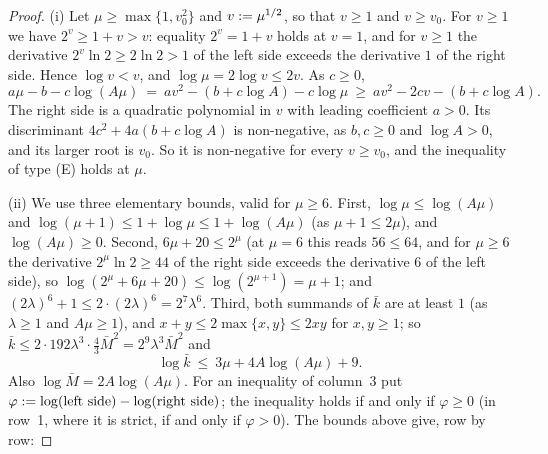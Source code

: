 \begin{proof}
(i) Let $\mu\ge\max\{1,v_0^2\}$ and $v\mathrel{:=}\mu^{1/2}$, so that $v\ge1$ and
$v\ge v_0$. For $v\ge1$ we have $2^v\ge1+v>v$: equality $2^v=1+v$ holds at
$v=1$, and for $v\ge1$ the derivative $2^v\ln2\ge2\ln2>1$ of the left side
exceeds the derivative $1$ of the right side. Hence $\log v<v$, and
$\log\mu=2\log v\le2v$. As $c\ge0$,
\[
a\mu-b-c\log(A\mu)\ =\ av^2-(b+c\log A)-c\log\mu\ \ge\ av^2-2cv-(b+c\log A).
\]
The right side is a quadratic polynomial in $v$ with leading coefficient
$a>0$. Its discriminant $4c^2+4a(b+c\log A)$ is non-negative, as $b,c\ge0$ and
$\log A>0$, and its larger root is $v_0$. So it is non-negative for every
$v\ge v_0$, and the inequality of type (E) holds at $\mu$.

(ii) We use three elementary bounds, valid for $\mu\ge6$. First,
$\log\mu\le\log(A\mu)$ and $\log(\mu+1)\le1+\log\mu\le1+\log(A\mu)$ (as
$\mu+1\le2\mu$), and $\log(A\mu)\ge0$. Second, $6\mu+20\le2^\mu$ (at $\mu=6$
this reads $56\le64$, and for $\mu\ge6$ the derivative $2^\mu\ln2\ge44$ of the
right side exceeds the derivative $6$ of the left side), so
$\log(2^\mu+6\mu+20)\le\log(2^{\mu+1})=\mu+1$; and
$(2\lambda)^6+1\le2\cdot(2\lambda)^6=2^7\lambda^6$. Third, both summands of
$\bar k$ are at least $1$ (as $\lambda\ge1$ and $A\mu\ge1$), and
$x+y\le2\max\{x,y\}\le2xy$ for $x,y\ge1$; so
$\bar k\le2\cdot192\lambda^3\cdot\frac43\bar M^2=2^9\lambda^3\bar M^2$ and
\[
\log\bar k\ \le\ 3\mu+4A\log(A\mu)+9 .
\]
Also $\log\bar M=2A\log(A\mu)$. For an inequality of column~3 put
$\varphi\mathrel{:=}\log(\text{left side})-\log(\text{right side})$; the inequality
holds if and only if $\varphi\ge0$ (in row~1, where it is strict, if and only
if $\varphi>0$). The bounds above give, row by row:
\end{proof}
